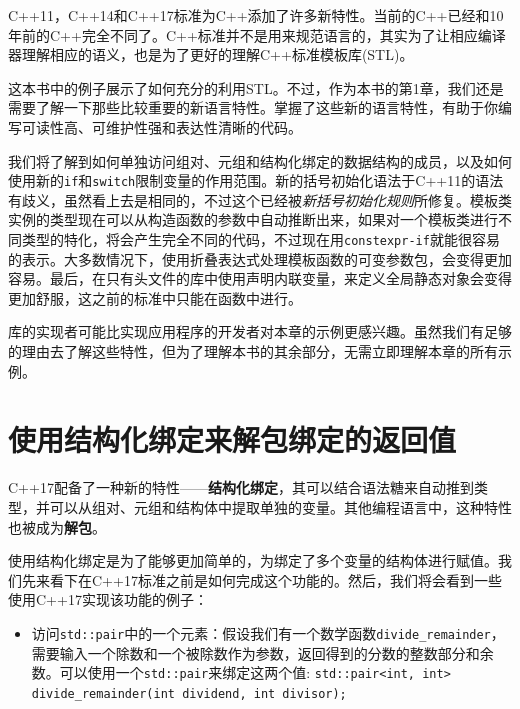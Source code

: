 C++11，C++14和C++17标准为C++添加了许多新特性。当前的C++已经和10年前的C++完全不同了。C++标准并不是用来规范语言的，其实为了让相应编译器理解相应的语义，也是为了更好的理解C++标准模板库(STL)。

这本书中的例子展示了如何充分的利用STL。不过，作为本书的第1章，我们还是需要了解一下那些比较重要的新语言特性。掌握了这些新的语言特性，有助于你编写可读性高、可维护性强和表达性清晰的代码。

我们将了解到如何单独访问组对、元组和结构化绑定的数据结构的成员，以及如何使用新的\texttt{if}和\texttt{switch}限制变量的作用范围。新的括号初始化语法于C++11的语法有歧义，虽然看上去是相同的，不过这个已经被\emph{新括号初始化规则}所修复。模板类实例的类型现在可以从构造函数的参数中自动推断出来，如果对一个模板类进行不同类型的特化，将会产生完全不同的代码，不过现在用\texttt{constexpr-if}就能很容易的表示。大多数情况下，使用折叠表达式处理模板函数的可变参数包，会变得更加容易。最后，在只有头文件的库中使用声明内联变量，来定义全局静态对象会变得更加舒服，这之前的标准中只能在函数中进行。

库的实现者可能比实现应用程序的开发者对本章的示例更感兴趣。虽然我们有足够的理由去了解这些特性，但为了理解本书的其余部分，无需立即理解本章的所有示例。


\section{使用结构化绑定来解包绑定的返回值}

C++17配备了一种新的特性——\textbf{结构化绑定}，其可以结合语法糖来自动推到类型，并可以从组对、元组和结构体中提取单独的变量。其他编程语言中，这种特性也被成为\textbf{解包}。


使用结构化绑定是为了能够更加简单的，为绑定了多个变量的结构体进行赋值。我们先来看下在C++17标准之前是如何完成这个功能的。然后，我们将会看到一些使用C++17实现该功能的例子：

\begin{itemize}
\item 访问\texttt{std::pair}中的一个元素：假设我们有一个数学函数\texttt{divide\_remainder}，需要输入一个除数和一个被除数作为参数，返回得到的分数的整数部分和余数。可以使用一个\texttt{std::pair}来绑定这两个值: \texttt{std::pair<int, int> divide\_remainder(int dividend, int divisor);}

\end{itemize}

